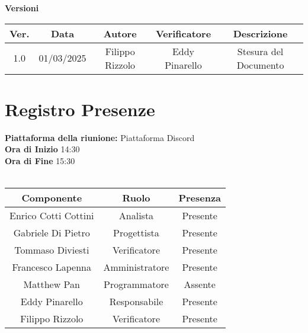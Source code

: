 \documentclass{article}
\begin{document}
\newpage
\begin{table}[h!]
\centering
\textbf{Versioni} \\ %
\vspace{2mm} %
\begin{tabular}{|c|c|c|c|c|}
    \hline
    \textbf{Ver.} & \textbf{Data} & \textbf{Autore} & \textbf{Verificatore} & \textbf{Descrizione} \\
    \hline
    1.0 & 01/03/2025 & Filippo Rizzolo & Eddy Pinarello & Stesura del Documento \\ 
    \hline                                  %
\end{tabular}
\end{table}



\newpage
\section{Registro Presenze}
\textbf{Piattaforma della riunione:} Piattaforma Discord \\
\textbf{Ora di Inizio} 14:30\\
\textbf{Ora di Fine} 15:30\\  %
\\
\begin{tabular}{|c|c|c|}  %
    \hline
    \textbf{Componente} & \textbf{Ruolo} & \textbf{Presenza}\\
    \hline
    Enrico Cotti Cottini & Analista & Presente \\ 
    \hline
    Gabriele Di Pietro & Progettista & Presente \\ 
    \hline
    Tommaso Diviesti & Verificatore & Presente \\ 
    \hline 
    Francesco Lapenna & Amministratore & Presente \\ 
    \hline
    Matthew Pan & Programmatore & Assente \\ 
    \hline 
    Eddy Pinarello & Responsabile & Presente \\ 
    \hline 
    Filippo Rizzolo & Verificatore & Presente \\ 
    \hline 
\end{tabular}
\end{document}
